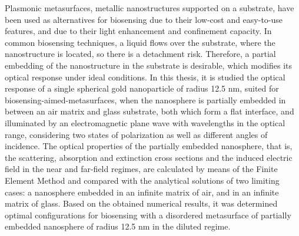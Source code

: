 

\begin{abstracts}        %
\vfill
\small
Plasmonic metasurfaces, metallic nanostructures supported on a substrate, have been used as alternatives for biosensing due to their low-cost and easy-to-use features, and due to their light enhancement and confinement capacity. In common biosensing techniques, a liquid flows over the substrate, where the nanostructure is located, so there is a  detachment risk. Therefore, a partial embedding of the nanostructure in the substrate is desirable, which modifies its optical response under ideal conditions. In this thesis, it is studied the optical response of a single spherical gold nanoparticle of radius 12.5 nm, suited for biosensing-aimed-metasurfaces, when the nanosphere is partially embedded in between an air matrix and glass substrate, both which form a flat interface, and illuminated by an electromagnetic plane wave with wavelengths in the optical range, considering two states of polarization as well as different angles of incidence. The optical properties of the partially embedded nanosphere, that is, the scattering, absorption and extinction cross sections and the induced electric field in the near and far-field regimes, are calculated by means of the Finite Element Method and compared with the analytical solutions of two limiting cases: a nanosphere embedded in an infinite matrix of air, and in an infinite matrix of glass. Based on the obtained numerical results, it was determined optimal configurations for  biosensing with a disordered metasurface of partially embedded nanosphere of radius 12.5 nm in the diluted regime.\\[2em]


\end{abstracts}

